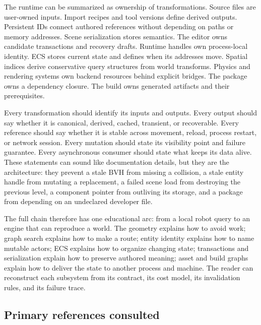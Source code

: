 The runtime can be summarized as ownership of transformations. Source files are user-owned inputs. Import recipes and tool versions define derived outputs. Persistent IDs connect authored references without depending on paths or memory addresses. Scene serialization stores semantics. The editor owns candidate transactions and recovery drafts. Runtime handles own process-local identity. ECS stores current state and defines when its addresses move. Spatial indices derive conservative query structures from world transforms. Physics and rendering systems own backend resources behind explicit bridges. The package owns a dependency closure. The build owns generated artifacts and their prerequisites.

Every transformation should identify its inputs and outputs. Every output should say whether it is canonical, derived, cached, transient, or recoverable. Every reference should say whether it is stable across movement, reload, process restart, or network session. Every mutation should state its visibility point and failure guarantee. Every asynchronous consumer should state what keeps its data alive. These statements can sound like documentation details, but they are the architecture: they prevent a stale BVH from missing a collision, a stale entity handle from mutating a replacement, a failed scene load from destroying the previous level, a component pointer from outliving its storage, and a package from depending on an undeclared developer file.

The full chain therefore has one educational arc: from a local robot query to an engine that can reproduce a world. The geometry explains how to avoid work; graph search explains how to make a route; entity identity explains how to name mutable actors; ECS explains how to organize changing state; transactions and serialization explain how to preserve authored meaning; asset and build graphs explain how to deliver the state to another process and machine. The reader can reconstruct each subsystem from its contract, its cost model, its invalidation rules, and its failure trace.

\subsection{Primary references consulted}\label{05-engine-i-ch008-primary-references-consulted}

\hypertarget{05-engine-i-ch008-primary-references-consulted}{}

